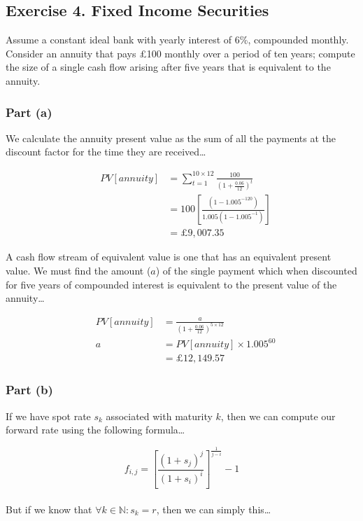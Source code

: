 \documentclass[11pt]{article}
\begin{document}
\subsection*{Exercise 4. Fixed Income Securities}

Assume a constant ideal bank with yearly interest of 6\%, compounded monthly. Consider an
annuity that pays £100 monthly over a period of ten years; compute the size of a single cash
flow arising after five years that is equivalent to the annuity.

\subsubsection*{Part (a)}

We calculate the annuity present value as the sum of all the payments at the discount factor
for the time they are received\dots

\setcounter{equation}{0}
\begin{eqnarray}
  & PV[annuity] &= \sum_{t=1}^{10 \times 12} \frac{100}{\left(1 + \frac{0.06}{12}\right)^{t}} \\[4mm]
  &&= 100 \left[ \frac{\left(1 - 1.005^{-120}\right)}{1.005\left(1 - 1.005^{-1}\right)} \right] \\[4mm]
  &&= £9,007.35
\end{eqnarray}

A cash flow stream of equivalent value is one that has an equivalent present value. We must find
the amount ($a$) of the single payment which when discounted for five years of compounded interest
is equivalent to the present value of the annuity\dots

\begin{eqnarray}
  & PV[annuity] &= \frac{a}{\left(1 + \frac{0.06}{12}\right)^{5 \times 12}} \\[4mm]
  & a &= PV[annuity] \times 1.005^{60} \\[4mm]
      &&= £12,149.57
\end{eqnarray}

\subsubsection*{Part (b)}

If we have spot rate $s_{k}$ associated with maturity $k$, then we can compute our forward
rate using the following formula\dots

\[ f_{i,j} = \left[ \frac{\left(1 + s_{j}\right)^{j}}{\left(1 + s_{i}\right)^{i}} \right]^{\frac{1}{j-i}} -1 \]
\\
But if we know that $\forall k\in\mathbb{N}:s_{k} = r$, then we can simply this\dots
\end{document}

